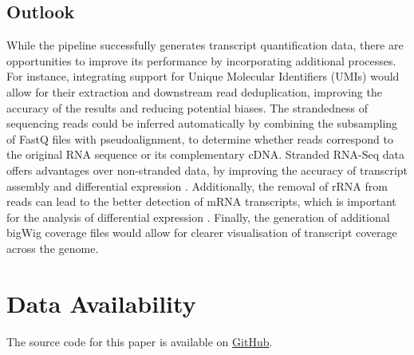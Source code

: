 \documentclass[12pt]{article}
\begin{document}
\subsection{Outlook}
While the pipeline successfully generates transcript quantification data, there are opportunities to improve its performance by incorporating additional processes. For instance, integrating support for Unique Molecular Identifiers (UMIs) would allow for their extraction and downstream read deduplication, improving the accuracy of the results and reducing potential biases. The strandedness of sequencing reads could be inferred automatically by combining the subsampling of FastQ files with pseudoalignment, to determine whether reads correspond to the original RNA sequence or its complementary cDNA. Stranded RNA-Seq data offers advantages over non-stranded data, by improving the accuracy of transcript assembly and differential expression \cite{Signal2022}. Additionally, the removal of rRNA from reads can lead to the better detection of mRNA transcripts, which is important for the analysis of differential expression \cite{Pastor2022}. Finally, the generation of additional bigWig coverage files would allow for clearer visualisation of transcript coverage across the genome.

\section*{Data Availability}
The source code for this paper is available on \href{{https://github.com/JuliaGraf/RNAseq}}{GitHub}.



\end{document}
